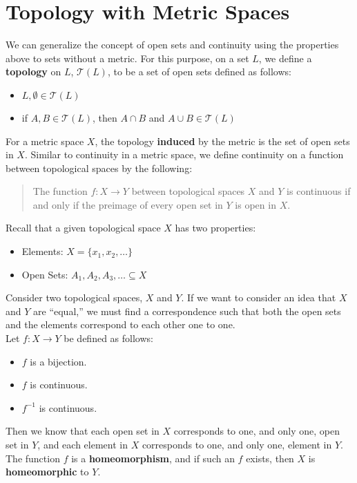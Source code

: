 \documentclass[12pt]{extarticle}
\begin{document}
  \section*{Topology with Metric Spaces}%
  We can generalize the concept of open sets and continuity using the properties above to sets without a metric. For this purpose, on a set $L$, we define a \textbf{topology} on $L$, $ \mathcal{T}(L) $, to be a set of open sets defined as follows:
  \begin{itemize}
    \item $L, \emptyset \in \mathcal{T}(L)$
    \item if $A,B\in \mathcal{T}(L)$, then $A\cap B$ and $A\cup B\in \mathcal{T}(L)$
  \end{itemize}
  For a metric space $X$, the topology \textbf{induced} by the metric is the set of open sets in $X$. Similar to continuity in a metric space, we define continuity on a function between topological spaces by the following:
  \begin{quote}
    The function $f: X\rightarrow Y$ between topological spaces $X$ and $Y$ is continuous if and only if the preimage of every open set in $Y$ is open in $X$.
  \end{quote}
  Recall that a given topological space $X$ has two properties:
  \begin{itemize}
    \item Elements: $X = \{x_1,x_2,\dots\}$
    \item Open Sets: $A_1,A_2,A_3,\dots \subseteq X$
  \end{itemize}
  Consider two topological spaces, $X$ and $Y$. If we want to consider an idea that $X$ and $Y$ are ``equal,'' we must find a correspondence such that both the open sets and the elements correspond to each other one to one.\\

  Let $f: X\rightarrow Y$ be defined as follows:
  \begin{itemize}
    \item $f$ is a bijection.
    \item $f$ is continuous.
    \item $f^{-1}$ is continuous.
  \end{itemize}
  Then we know that each open set in $X$ corresponds to one, and only one, open set in $Y$, and each element in $X$ corresponds to one, and only one, element in $Y$. The function $f$ is a \textbf{homeomorphism}, and if such an $f$ exists, then $X$ is \textbf{homeomorphic} to $Y$.
\end{document}

